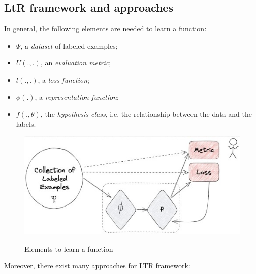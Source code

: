 \subsection{LtR framework and approaches}

In general, the following elements are needed to learn a function:

\begin{itemize}
    \item $\Psi$, a \textit{dataset} of labeled examples;
    \item $U(.,.)$, an \textit{evaluation metric};
    \item $l(.,.)$, a \textit{loss function};
    \item $\phi(.)$, a \textit{representation function};
    \item  $f(., \theta)$, the \textit{hypothesis class}, i.e. the relationship between the data and the labels.
\end{itemize}

\begin{figure}[h!]
		\centering
		\includegraphics[scale = 1.5]{img/learning a function.jpg}
        \label{learning}
        \caption{Elements to learn a function}
\end{figure}

Moreover, there exist many approaches for LTR framework:

